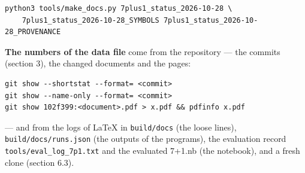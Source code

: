 \documentclass[10pt,a4paper]{article}
\begin{document}
\begin{Verbatim}[fontsize=\small,frame=single,framesep=2mm]
python3 tools/make_docs.py 7plus1_status_2026-10-28 \
    7plus1_status_2026-10-28_SYMBOLS 7plus1_status_2026-10-28_PROVENANCE
\end{Verbatim}
\textbf{The numbers of the data file} come from the repository — the commits (section 3), the changed documents and the pages:

\begin{Verbatim}[fontsize=\small,frame=single,framesep=2mm]
git show --shortstat --format= <commit>
git show --name-only --format= <commit>
git show 102f399:<document>.pdf > x.pdf && pdfinfo x.pdf
\end{Verbatim}
— and from the logs of LaTeX in \texttt{build/\allowbreak{}docs} (the loose lines), \texttt{build/\allowbreak{}docs/\allowbreak{}runs.json} (the outputs of the programs), the evaluation record \texttt{tools/\allowbreak{}eval\_\allowbreak{}log\_\allowbreak{}7p1.txt} and the evaluated 7+1.nb (the notebook), and a fresh clone (section 6.3).
\end{document}
